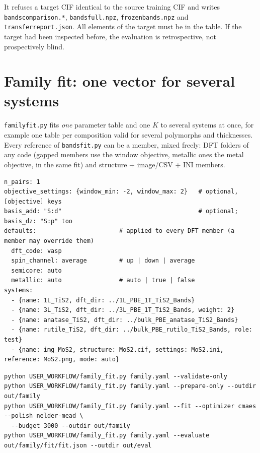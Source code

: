 \documentclass[11pt,a4paper]{article}
\newcommand{\cmd}[1]{\texttt{#1}}
\renewcommand{\_}{\origunderscore\allowbreak}
\begin{document}
It refuses a target CIF identical to the source training CIF and writes \cmd{bands\_comparison.*},
\cmd{bands\_full.npz}, \cmd{frozen\_bands.npz} and \cmd{transfer\_report.json}. All elements of the
target must be in the table. If the target had been inspected before, the evaluation is retrospective,
not prospectively blind.

\section{Family fit: one vector for several systems}\label{sec:family}

\cmd{family\_fit.py} fits \emph{one} parameter table and one $K$ to several systems at once, for example
one table per composition valid for several polymorphs and thicknesses. Every reference of
\cmd{bands\_fit.py} can be a member, mixed freely: DFT folders of any code (gapped members use the window
objective, metallic ones the metal objective, in the same fit) and structure + image/CSV + INI members.

\begin{lstlisting}[style=ini]
n_pairs: 1
objective_settings: {window_min: -2, window_max: 2}   # optional, [objective] keys
basis_add: "S:d"                                      # optional; basis_dz: "S:p" too
defaults:                       # applied to every DFT member (a member may override them)
  dft_code: vasp
  spin_channel: average         # up | down | average
  semicore: auto
  metallic: auto                # auto | true | false
systems:
  - {name: 1L_TiS2, dft_dir: ../1L_PBE_1T_TiS2_Bands}
  - {name: 3L_TiS2, dft_dir: ../3L_PBE_1T_TiS2_Bands, weight: 2}
  - {name: anatase_TiS2, dft_dir: ../bulk_PBE_anatase_TiS2_Bands}
  - {name: rutile_TiS2, dft_dir: ../bulk_PBE_rutilo_TiS2_Bands, role: test}
  - {name: img_MoS2, structure: MoS2.cif, settings: MoS2.ini, reference: MoS2.png, mode: auto}
\end{lstlisting}

\begin{lstlisting}[style=sh]
python USER_WORKFLOW/family_fit.py family.yaml --validate-only
python USER_WORKFLOW/family_fit.py family.yaml --prepare-only --outdir out/family
python USER_WORKFLOW/family_fit.py family.yaml --fit --optimizer cmaes --polish nelder-mead \
  --budget 3000 --outdir out/family
python USER_WORKFLOW/family_fit.py family.yaml --evaluate out/family/fit/fit.json --outdir out/eval
\end{lstlisting}
\end{document}
